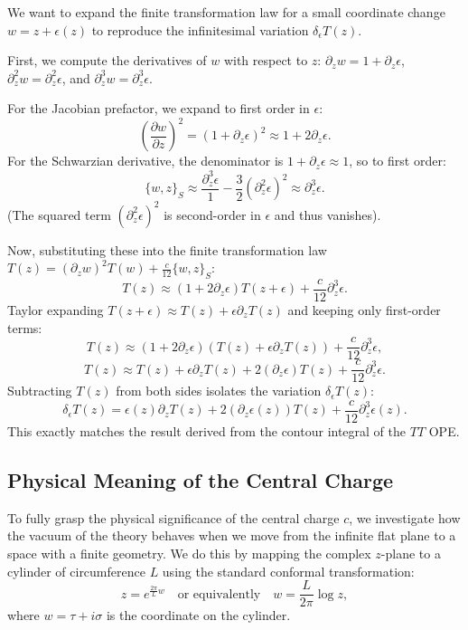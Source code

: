 \begin{example}
    We want to expand the finite transformation law for a small coordinate change \(w = z + \epsilon(z)\) to reproduce the infinitesimal variation \(\delta_\epsilon T(z)\).

    First, we compute the derivatives of \(w\) with respect to \(z\):
    \(\partial_z w = 1 + \partial_z \epsilon\), \(\partial_z^2 w = \partial_z^2 \epsilon\), and \(\partial_z^3 w = \partial_z^3 \epsilon\).

    For the Jacobian prefactor, we expand to first order in \(\epsilon\):
    \[
        \left(\frac{\partial w}{\partial z}\right)^2 = (1 + \partial_z \epsilon)^2 \approx 1 + 2\partial_z \epsilon.
    \]
    For the Schwarzian derivative, the denominator is \(1 + \partial_z \epsilon \approx 1\), so to first order:
    \[
        \{w, z\}_S \approx \frac{\partial_z^3 \epsilon}{1} - \frac{3}{2} (\partial_z^2 \epsilon)^2 \approx \partial_z^3 \epsilon.
    \]
    (The squared term \((\partial_z^2 \epsilon)^2\) is second-order in \(\epsilon\) and thus vanishes).

    Now, substituting these into the finite transformation law \(T(z) = (\partial_z w)^2 T(w) + \frac{c}{12} \{w, z\}_S\):
    \[
        T(z) \approx (1 + 2\partial_z \epsilon) T(z + \epsilon) + \frac{c}{12} \partial_z^3 \epsilon.
    \]
    Taylor expanding \(T(z + \epsilon) \approx T(z) + \epsilon \partial_z T(z)\) and keeping only first-order terms:
    \[
        T(z) \approx (1 + 2\partial_z \epsilon) (T(z) + \epsilon \partial_z T(z)) + \frac{c}{12} \partial_z^3 \epsilon,
    \]
    \[
        T(z) \approx T(z) + \epsilon \partial_z T(z) + 2(\partial_z \epsilon)T(z) + \frac{c}{12} \partial_z^3 \epsilon.
    \]
    Subtracting \(T(z)\) from both sides isolates the variation \(\delta_\epsilon T(z)\):
    \[
        \delta_\epsilon T(z) = \epsilon(z) \partial_z T(z) + 2(\partial_z \epsilon(z)) T(z) + \frac{c}{12} \partial_z^3 \epsilon(z).
    \]
    This exactly matches the result derived from the contour integral of the \(TT\) OPE.
\end{example}

\subsection{Physical Meaning of the Central Charge}

To fully grasp the physical significance of the central charge \(c\), we investigate how the vacuum of the theory behaves when we move from the infinite flat plane to a space with a finite geometry. We do this by mapping the complex \(z\)-plane to a cylinder of circumference \(L\) using the standard conformal transformation:
\[
    z = e^{\frac{2\pi}{L}w} \quad \text{or equivalently} \quad w = \frac{L}{2\pi} \log z,
\]
where \(w = \tau + i\sigma\) is the coordinate on the cylinder.


